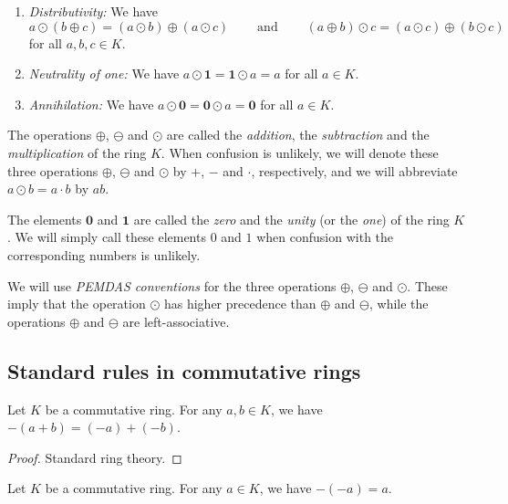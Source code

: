 \begin{definition}
\begin{enumerate}
\item \emph{Distributivity:} We have%
\[
a\odot\left(  b\oplus c\right)  =\left(  a\odot b\right)  \oplus\left(  a\odot
c\right)  \ \ \ \ \ \ \ \ \ \ \text{and}\ \ \ \ \ \ \ \ \ \ \left(  a\oplus
b\right)  \odot c=\left(  a\odot c\right)  \oplus\left(  b\odot c\right)
\]
for all $a,b,c\in K$.

\item \emph{Neutrality of one:} We have $a\odot\mathbf{1}=\mathbf{1}\odot a=a$
for all $a\in K$.

\item \emph{Annihilation:} We have $a\odot\mathbf{0}=\mathbf{0}\odot
a=\mathbf{0}$ for all $a\in K$.
\end{enumerate}

The operations $\oplus$, $\ominus$ and $\odot$ are called the \emph{addition},
the \emph{subtraction} and the \emph{multiplication} of the ring $K$.
When confusion is unlikely,
we will denote these three operations $\oplus$, $\ominus$ and $\odot$ by $+$,
$-$ and $\cdot$, respectively, and we will abbreviate $a\odot b=a\cdot b$ by
$ab$.

The elements $\mathbf{0}$ and $\mathbf{1}$ are called the \emph{zero} and the
\emph{unity} (or the \emph{one}) of the ring $K$.
We will simply call these elements $0$ and $1$ when confusion with the
corresponding numbers is unlikely.

We will use \emph{PEMDAS conventions} for the three operations $\oplus$,
$\ominus$ and $\odot$. These imply that the operation $\odot$ has higher
precedence than $\oplus$ and $\ominus$, while the operations $\oplus$ and
$\ominus$ are left-associative.
\end{definition}

\subsection{Standard rules in commutative rings}

\begin{lemma}
\label{lem.commring.neg-add}
\leanhelper
\leanok
Let $K$ be a commutative ring. For any $a,b\in K$, we have
$-\left(  a+b\right)  =\left(  -a\right)  +\left(  -b\right)$.
\end{lemma}

\begin{proof}
\leanok
Standard ring theory.
\end{proof}

\begin{lemma}
\label{lem.commring.neg-neg}
\leanhelper
\leanok
Let $K$ be a commutative ring. For any $a\in K$, we have
$-\left(  -a\right)  =a$.
\end{lemma}

